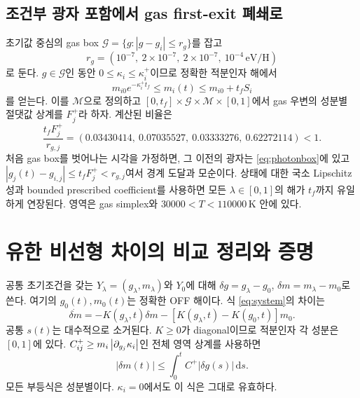 \documentclass[11pt,a4paper]{article}
\numberwithin{equation}{section}
\newcommand{\dd}{\mathrm d}\newcommand{\HH}{\mathrm{HH}}\newcommand{\eV}{\mathrm{eV}}
\begin{document}
\subsection*{조건부 광자 포함에서 gas first-exit 폐쇄로}
초기값 중심의 gas box $\mathcal G=\{g:|g-g_i|\le r_g\}$를 잡고
\begin{equation}
 r_g=(10^{-7},\ 2\times10^{-7},\ 2\times10^{-7},\ 10^{-4}\,\eV/\mathrm H)
\end{equation}
로 둔다. $g\in\mathcal G$인 동안 $0\le\kappa_i\le\kappa_i^+$이므로 정확한 적분인자 해에서
\begin{equation}
 m_{i0}e^{-\kappa_i^+t_f}\le m_i(t)\le m_{i0}+t_fS_i
 \label{eq:photonbox}
\end{equation}
를 얻는다. 이를 $\mathcal M$으로 정의하고 $[0,t_f]\times\mathcal G\times\mathcal M\times[0,1]$에서 gas 우변의 성분별 절댓값 상계를 $F_j^+$라 하자. 계산된 비율은
\begin{equation}
 \frac{t_fF_j^+}{r_{g,j}}=
 (0.03430414,\ 0.07035527,\ 0.03333276,\ 0.62272114)<1.
\end{equation}
처음 gas box를 벗어나는 시각을 가정하면, 그 이전의 광자는 \eqref{eq:photonbox}에 있고 $|g_j(t)-g_{i,j}|\le t_fF_j^+<r_{g,j}$여서 경계 도달과 모순이다. 상태에 대한 국소 Lipschitz성과 bounded prescribed coefficient를 사용하면 모든 $\lambda\in[0,1]$의 해가 $t_f$까지 유일하게 연장된다. 영역은 gas simplex와 $30000<T<110000\,\mathrm K$ 안에 있다.

\newpage
\section{유한 비선형 차이의 비교 정리와 증명}
공통 초기조건을 갖는 $Y_\lambda=(g_\lambda,m_\lambda)$와 $Y_0$에 대해 $\delta g=g_\lambda-g_0$, $\delta m=m_\lambda-m_0$로 쓴다. 여기의 $g_0(t),m_0(t)$는 정확한 OFF 해이다. 식 \eqref{eq:system}의 차이는
\begin{equation}
 \dot{\delta m}=-K(g_\lambda,t)\delta m-
 [K(g_\lambda,t)-K(g_0,t)]m_0.
 \label{eq:diffphot}
\end{equation}
공통 $s(t)$는 대수적으로 소거된다. $K\ge0$가 diagonal이므로 적분인자 각 성분은 $[0,1]$에 있다. $C^+_{ij}\ge m_i\left|\partial_{g_j}\kappa_i\right|$인 전체 영역 상계를 사용하면
\begin{equation}
 |\delta m(t)|\le\int_0^t C^+|\delta g(s)|\,\dd s.
 \label{eq:phbound}
\end{equation}
모든 부등식은 성분별이다. $\kappa_i=0$에서도 이 식은 그대로 유효하다.
\end{document}

